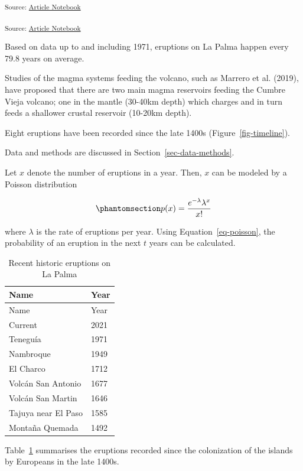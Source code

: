 \documentclass[
]{agujournal2019}
\begin{document}
\textsubscript{Source:
\href{https://tipauwel.github.io/manuscript-tutorial/index.qmd.html}{Article
Notebook}}

\textsubscript{Source:
\href{https://tipauwel.github.io/manuscript-tutorial/index.qmd.html}{Article
Notebook}}

Based on data up to and including 1971, eruptions on La Palma happen
every 79.8 years on average.

Studies of the magma systems feeding the volcano, such as Marrero et al.
(2019), have proposed that there are two main magma reservoirs feeding
the Cumbre Vieja volcano; one in the mantle (30-40km depth) which
charges and in turn feeds a shallower crustal reservoir (10-20km depth).

Eight eruptions have been recorded since the late 1400s
(Figure~\ref{fig-timeline}).

Data and methods are discussed in Section~\ref{sec-data-methods}.

Let \(x\) denote the number of eruptions in a year. Then, \(x\) can be
modeled by a Poisson distribution

\begin{equation}\protect\phantomsection\label{eq-poisson}{
p(x) = \frac{e^{-\lambda} \lambda^{x}}{x !}
}\end{equation}

where \(\lambda\) is the rate of eruptions per year. Using
Equation~\ref{eq-poisson}, the probability of an eruption in the next
\(t\) years can be calculated.

\begin{longtable}[]{@{}ll@{}}
\caption{Recent historic eruptions on La
Palma}\label{tbl-history}\tabularnewline
\toprule\noalign{}
Name & Year \\
\midrule\noalign{}
\endfirsthead
\toprule\noalign{}
Name & Year \\
\midrule\noalign{}
\endhead
\bottomrule\noalign{}
\endlastfoot
Current & 2021 \\
Teneguía & 1971 \\
Nambroque & 1949 \\
El Charco & 1712 \\
Volcán San Antonio & 1677 \\
Volcán San Martin & 1646 \\
Tajuya near El Paso & 1585 \\
Montaña Quemada & 1492 \\
\end{longtable}

Table~\ref{tbl-history} summarises the eruptions recorded since the
colonization of the islands by Europeans in the late 1400s.
\end{document}
